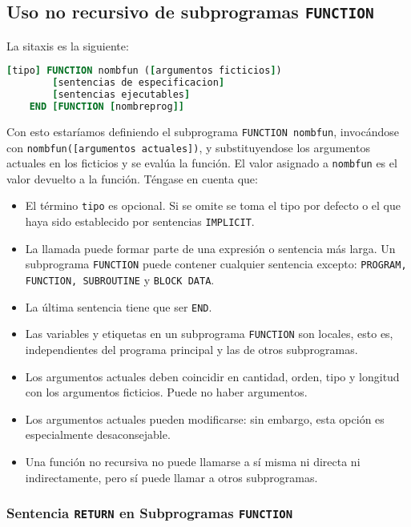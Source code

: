 \subsection{Uso no recursivo de subprogramas {\tt FUNCTION}}

La sitaxis es la siguiente:

\begin{lstlisting}[language=Fortran]
	[tipo] FUNCTION nombfun ([argumentos ficticios])
		[sentencias de especificacion]
		[sentencias ejecutables]
	END [FUNCTION [nombreprog]]
\end{lstlisting}

Con esto estaríamos definiendo el subprograma {\tt FUNCTION nombfun}, invocándose con {\tt nombfun([argumentos actuales])}, y substituyendose los argumentos actuales en los ficticios y se evalúa la función. El valor asignado a {\tt nombfun} es el valor devuelto a la función. Téngase en cuenta que:

\begin{itemize}
	\item El término {\tt tipo} es opcional. Si se omite se toma el tipo por defecto o el que haya sido establecido por sentencias {\tt IMPLICIT}. 
	\item La llamada puede formar parte de una expresión o sentencia más larga. Un subprograma {\tt FUNCTION} puede contener cualquier sentencia excepto: {\tt PROGRAM, FUNCTION, SUBROUTINE} y {\tt BLOCK DATA}.
	\item La última sentencia tiene que ser {\tt END}. 
	\item Las variables y etiquetas en un subprograma {\tt FUNCTION} son locales, esto es, independientes del programa principal y las de otros subprogramas. 
	\item Los argumentos actuales deben coincidir en cantidad, orden, tipo y longitud con los argumentos ficticios. Puede no haber argumentos.
	\item Los argumentos actuales pueden modificarse: sin embargo, esta opción es especialmente desaconsejable. 
	\item Una función no recursiva no puede llamarse a sí misma ni directa ni indirectamente, pero sí puede llamar a otros subprogramas.
\end{itemize}

\subsubsection{Sentencia {\tt RETURN} en Subprogramas {\tt FUNCTION}}

